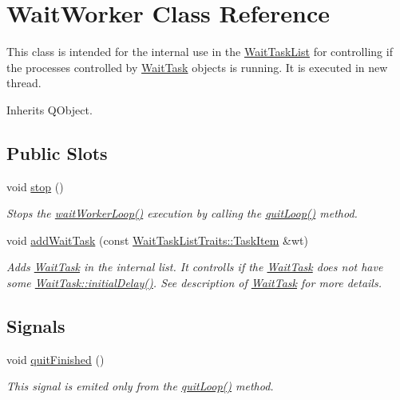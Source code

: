 \hypertarget{class_wait_worker}{}\section{Wait\+Worker Class Reference}
\label{class_wait_worker}


This class is intended for the internal use in the \hyperlink{class_wait_task_list}{Wait\+Task\+List} for controlling if the processes controlled by \hyperlink{class_wait_task}{Wait\+Task} objects is running. It is executed in new thread.  




Inherits Q\+Object.

\subsection*{Public Slots}
\begin{DoxyCompactItemize}
\item 
\hypertarget{class_wait_worker_af01864effa7662c8261128ff12fb922d}{}void \hyperlink{class_wait_worker_af01864effa7662c8261128ff12fb922d}{stop} ()\label{class_wait_worker_af01864effa7662c8261128ff12fb922d}

\begin{DoxyCompactList}\small\item\em Stops the \hyperlink{class_wait_worker_a434d284c0e08697979b5c8c1a53fd529}{wait\+Worker\+Loop()} execution by calling the \hyperlink{class_wait_worker_a52b9f53cccaa737e7de6d978c96ff9ab}{quit\+Loop()} method. \end{DoxyCompactList}\item 
void \hyperlink{class_wait_worker_adaff9ea88795fa9d902711c1952828cd}{add\+Wait\+Task} (const \hyperlink{struct_wait_task_list_traits_1_1_task_item}{Wait\+Task\+List\+Traits\+::\+Task\+Item} \&wt)
\begin{DoxyCompactList}\small\item\em Adds \hyperlink{class_wait_task}{Wait\+Task} in the internal list. It controlls if the \hyperlink{class_wait_task}{Wait\+Task} does not have some \hyperlink{class_wait_task_a3984ae37eae1a984db2f2417df2bfbbf}{Wait\+Task\+::initial\+Delay()}. See description of \hyperlink{class_wait_task}{Wait\+Task} for more details. \end{DoxyCompactList}\end{DoxyCompactItemize}
\subsection*{Signals}
\begin{DoxyCompactItemize}
\item 
\hypertarget{class_wait_worker_a5f65bc5e4691e9542afef8df55bf27be}{}void \hyperlink{class_wait_worker_a5f65bc5e4691e9542afef8df55bf27be}{quit\+Finished} ()\label{class_wait_worker_a5f65bc5e4691e9542afef8df55bf27be}

\begin{DoxyCompactList}\small\item\em This signal is emited only from the \hyperlink{class_wait_worker_a52b9f53cccaa737e7de6d978c96ff9ab}{quit\+Loop()} method. \end{DoxyCompactList}\end{DoxyCompactItemize}
